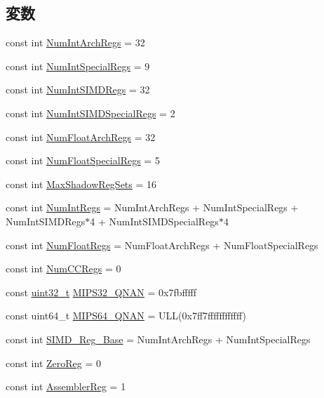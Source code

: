 \subsection*{変数}
\begin{DoxyCompactItemize}
\item 
const int \hyperlink{namespaceMipsISA_a405c0abe85dc0da846c120e3b31f375c}{NumIntArchRegs} = 32
\item 
const int \hyperlink{namespaceMipsISA_aa4755d292c82d3f9a290e04202de41de}{NumIntSpecialRegs} = 9
\item 
const int \hyperlink{namespaceMipsISA_a367be163cb58d552cce5a2be27b6809b}{NumIntSIMDRegs} = 32
\item 
const int \hyperlink{namespaceMipsISA_a945a32fd39bae07e01f29b83e9b36c56}{NumIntSIMDSpecialRegs} = 2
\item 
const int \hyperlink{namespaceMipsISA_a9ec947def3616ab9415089776195fa09}{NumFloatArchRegs} = 32
\item 
const int \hyperlink{namespaceMipsISA_a49908eb80616530afc519599ec46e42e}{NumFloatSpecialRegs} = 5
\item 
const int \hyperlink{namespaceMipsISA_abcad52ef12d61db0e043f455982e4f01}{MaxShadowRegSets} = 16
\item 
const int \hyperlink{namespaceMipsISA_a9c412b5118ce369570c156c4e156638a}{NumIntRegs} = NumIntArchRegs + NumIntSpecialRegs + NumIntSIMDRegs$\ast$4 + NumIntSIMDSpecialRegs$\ast$4
\item 
const int \hyperlink{namespaceMipsISA_a627b25288f2452be107872a138df8b85}{NumFloatRegs} = NumFloatArchRegs + NumFloatSpecialRegs
\item 
const int \hyperlink{namespaceMipsISA_a717317b863009b3e1b683c3bdddb9fd3}{NumCCRegs} = 0
\item 
const \hyperlink{Type_8hh_a435d1572bf3f880d55459d9805097f62}{uint32\_\-t} \hyperlink{namespaceMipsISA_ade780efa968a53a892f8bd18ca98f768}{MIPS32\_\-QNAN} = 0x7fbfffff
\item 
const uint64\_\-t \hyperlink{namespaceMipsISA_adb5f9fda6003fbf909506191e9814579}{MIPS64\_\-QNAN} = ULL(0x7ff7ffffffffffff)
\item 
const int \hyperlink{namespaceMipsISA_aca56f2249a1261d2059a1197683c68db}{SIMD\_\-Reg\_\-Base} = NumIntArchRegs + NumIntSpecialRegs
\item 
const int \hyperlink{namespaceMipsISA_a33dbba4a12f6733a5ecc2d2b3542b7ee}{ZeroReg} = 0
\item 
const int \hyperlink{namespaceMipsISA_afad76b764425e35f174d2d4b7deedf5c}{AssemblerReg} = 1

\end{DoxyCompactItemize}
